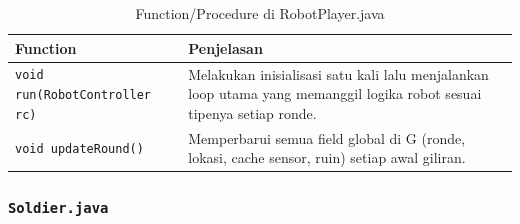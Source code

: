 \documentclass{article}
\begin{document}
\begin{enumerate}[label=\alph*.]
\begin{longtable}{|p{}|p{}|}
\caption{Function/Procedure di RobotPlayer.java} \\
\hline
\textbf{Function} & \textbf{Penjelasan} \\
\hline
\endhead
\hline
\endfoot
\texttt{void run(RobotController rc)} & Melakukan inisialisasi satu kali lalu menjalankan loop utama yang memanggil logika robot sesuai tipenya setiap ronde. \\
\hline
\texttt{void updateRound()} & Memperbarui semua field global di G (ronde, lokasi, cache sensor, ruin) setiap awal giliran. \\
\hline
\end{longtable}

\subsubsection{\lstinline|Soldier.java|}


\end{enumerate}
\end{document}
